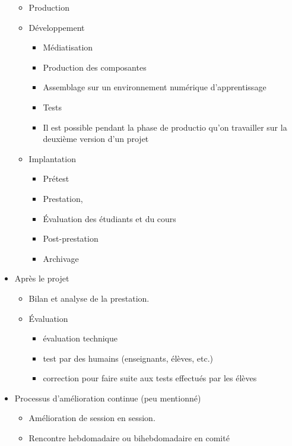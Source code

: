 \begin{frame}[allowframebreaks]
\begin{itemize}
							\begin{itemize}
							\item Production
							\item Développement
								\begin{itemize}
								\item Médiatisation
								\item Production des composantes
								\item Assemblage sur un environnement numérique d'apprentissage
								\item Tests
								\item Il est possible pendant la phase de productio qu'on travailler sur la deuxième version d'un projet
								\end{itemize}
							\item Implantation
								\begin{itemize}
								\item Prétest
								\item Prestation,
								\item Évaluation des étudiants et du cours
								\item Post-prestation
								\item Archivage
								\end{itemize}
							\end{itemize}
						\framebreak
						\item Après le projet
							\begin{itemize}
							\item Bilan et analyse de la prestation.
							\item Évaluation
								\begin{itemize}
								\item évaluation technique
								\item test par des humains (enseignants, élèves, etc.)
								\item correction pour faire suite aux tests effectués par les élèves
								\end{itemize}
							\end{itemize}	
						\item Processus d'amélioration continue (peu mentionné)
								\begin{itemize}
								\item Amélioration de session en session.
								\item Rencontre hebdomadaire ou bihebdomadaire en comité
								\end{itemize}
						\end{itemize}		
							
						
					\end{frame}
							
